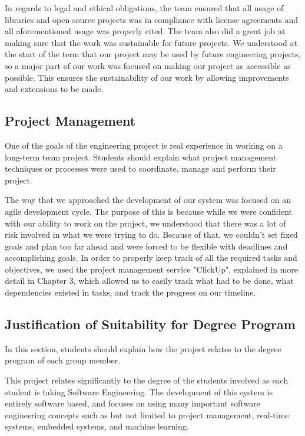 \documentclass[titlepage, draft]{article}
\begin{document}
In regards to legal and ethical obligations, the team ensured that all usage of libraries and open source projects was in compliance with license agreements and all aforementioned usage was properly cited. The team also did a great job at making sure that the work was sustainable for future projects. We understood at the start of the term that our project may be used by future engineering projects, so a major part of our work was focused on making our project as accessible as possible. This ensures the sustainability of our work by allowing improvements and extensions to be made.

\subsection{Project Management}
One of the goals of the engineering project is real experience in working on a long-term team project. Students should explain what project management techniques or processes were used to coordinate, manage and perform their project.

The way that we approached the development of our system was focused on an agile development cycle. The purpose of this is because while we were confident with our ability to work on the project, we understood that there was a lot of risk involved in what we were trying to do. Because of that, we couldn't set fixed goals and plan too far ahead and were forced to be flexible with deadlines and accomplishing goals. In order to properly keep track of all the required tasks and objectives, we used the project management service "ClickUp", explained in more detail in Chapter 3, which allowed us to easily track what had to be done, what dependencies existed in tasks, and track the progress on our timeline.

\subsection{Justification of Suitability for Degree Program}
In this section, students should explain how the project
relates to the degree program of each group member.

This project relates significantly to the degree of the students involved as each student is taking Software Engineering. The development of this system is entirely software based, and focuses on using many important software engineering concepts such as but not limited to project management, real-time systems, embedded systems, and machine learning.
\end{document}
